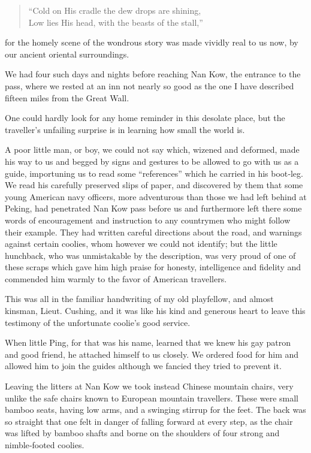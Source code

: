 \documentclass[12pt]{book}
\begin{document}
\begin{quote}
“Cold on His cradle the dew drops are shining, \\
Low lies His head, with the beasts of the stall,”
\end{quote}
for the homely scene of the wondrous story was made vividly real to us now,
by our ancient oriental surroundings.

We had four such days and nights before reaching Nan Kow, the entrance to
the pass, where we rested at an inn not nearly so good as the one I have described
fifteen miles from the Great Wall.

One could hardly look for any home reminder in this desolate place, but the
traveller’s unfailing surprise is in learning how small the world is.

A poor little man, or boy, we could not say which, wizened and deformed,
made his way to us and begged by signs and gestures to be allowed to go with
us as a guide, importuning us to read some “references” which he carried in his
boot‐leg. We read his carefully preserved slips of paper, and discovered by them
that some young American navy officers, more adventurous than those we had
left behind at Peking, had penetrated Nan Kow pass before us and furthermore
left there some words of encouragement and instruction to any countrymen who
might follow their example. They had written careful directions about the road,
and warnings against certain coolies, whom however we could not identify; but
the little hunchback, who was unmistakable by the description, was very proud
of one of these scraps which gave him high praise for honesty, intelligence and
fidelity and commended him warmly to the favor of American travellers.

This was all in the familiar handwriting of my old playfellow, and almost
kinsman, Lieut. Cushing, and it was like his kind and generous heart to leave this
testimony of the unfortunate coolie’s good service.

When little Ping, for that was his name, learned that we knew his gay patron
and good friend, he attached himself to us closely. We ordered food for him and
allowed him to join the guides although we fancied they tried to prevent it.

Leaving the litters at Nan Kow we took instead Chinese mountain chairs, very
unlike the safe chairs known to European mountain travellers. These were small
bamboo seats, having low arms, and a swinging stirrup for the feet. The back
was so straight that one felt in danger of falling forward at every step, as the
chair was lifted by bamboo shafts and borne on the shoulders of four strong and
nimble‐footed coolies.
\end{document}
